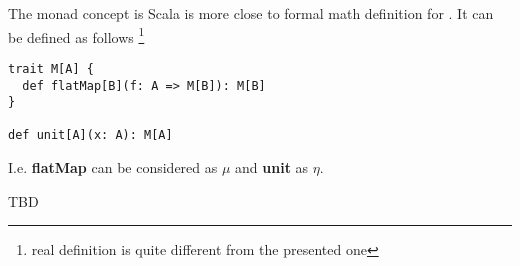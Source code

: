 \begin{example}
The monad concept is Scala is more close to formal math definition for
. It can be defined as follows 
\footnote{real definition is quite different from the presented one}
\label{ex:monad_scala}
\begin{verbatim}
trait M[A] {
  def flatMap[B](f: A => M[B]): M[B]
}
  
def unit[A](x: A): M[A]
\end{verbatim} 
I.e. \textbf{flatMap} can be considered as $\mu$ and
\textbf{unit} as $\eta$. 
\end{example}

TBD

